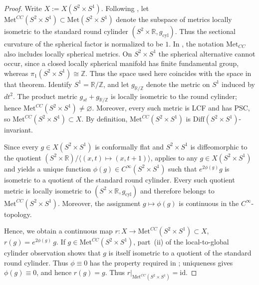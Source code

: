 \documentclass[12pt,oneside,a4paper]{article}
\theoremstyle{mytheorem}
\theoremstyle{remark}
\theoremstyle{definition}
\begin{document}
\begin{proof}
Write $X:=X(S^2\times S^1)$. Following
\cite{2019arXiv190908710B}, let
$\mathrm{Met}^{CC}(S^2\times S^1)\subset\mathrm{Met}(S^2\times S^1)$ denote
the subspace of metrics locally isometric to the standard round cylinder
$(S^2\times\mathbb R,g_{\mathrm{cyl}})$. Thus the sectional curvature of the
spherical factor is normalized to be $1$. In
\cite[Theorem~1.2]{2019arXiv190908710B}, the notation $\mathrm{Met}_{CC}$ also
includes locally spherical metrics. On $S^2\times S^1$ the spherical
alternative cannot occur, since a closed locally spherical manifold has finite
fundamental group, whereas $\pi_1(S^2\times S^1)\cong\mathbb Z$. Thus the
space used here coincides with the space in that theorem. Identify
$S^1=\mathbb R/\mathbb Z$, and let $g_{\mathbb R/\mathbb Z}$ denote the
metric on $S^1$ induced by $dt^2$. The product metric
$g_{st}+g_{\mathbb R/\mathbb Z}$ is locally isometric to the round cylinder;
hence
$\mathrm{Met}^{CC}(S^2\times S^1)\neq\varnothing$. Moreover, every such metric is LCF and has
PSC, so $\mathrm{Met}^{CC}(S^2\times S^1)\subset X$.
By definition, $\mathrm{Met}^{CC}(S^2\times S^1)$ is $\mathrm{Diff}(S^2\times S^1)$-invariant.

Since every $g\in X(S^2\times S^1)$ is conformally flat and
$S^2\times S^1$ is diffeomorphic to the quotient
\((S^2\times\mathbb R)/\langle(x,t)\mapsto(x,t+1)\rangle\),
\cite[Lemma~9.2(b)]{2019arXiv190908710B} applies to any
$g\in X(S^2\times S^1)$ and yields a unique function
$\phi(g)\in C^\infty(S^2\times S^1)$ such that
$e^{2\phi(g)} g$ is isometric to a quotient of the standard round cylinder.
Every such quotient metric is locally isometric to
$(S^2\times\mathbb R,g_{\mathrm{cyl}})$ and therefore belongs to
$\mathrm{Met}^{CC}(S^2\times S^1)$. Moreover, the assignment
\(g \mapsto \phi(g)\) is continuous in the \(C^\infty\)-topology.
 
Hence, we obtain a continuous map
\(r\colon X \to \mathrm{Met}^{CC}(S^2\times S^1) \subset X\),
\(r(g) = e^{2\phi(g)}\, g\).
If $g\in \mathrm{Met}^{CC}(S^2\times S^1)$, part~(ii) of the
local-to-global cylinder observation shows that $g$ is itself isometric to a
quotient of the standard round cylinder. Thus $\phi\equiv0$ has the property required in
\cite[Lemma~9.2(b)]{2019arXiv190908710B}; uniqueness gives
$\phi(g)\equiv0$, and hence $r(g)=g$. Thus
$r|_{\mathrm{Met}^{CC}(S^2\times S^1)}=\mathrm{id}$.


\end{proof}
\end{document}

